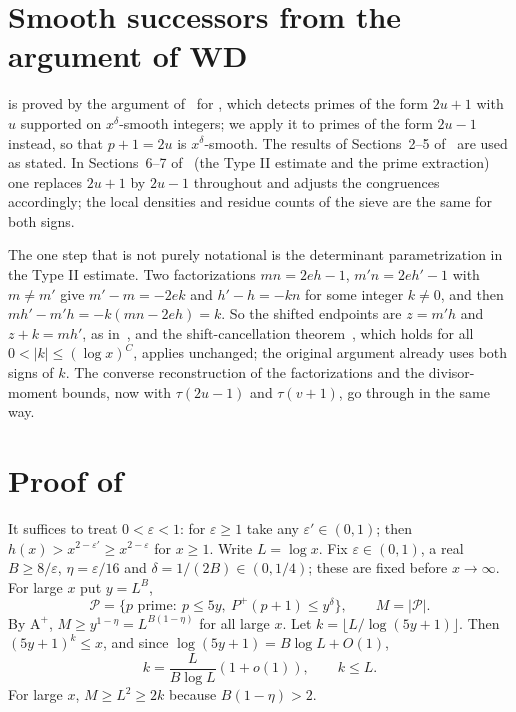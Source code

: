 \documentclass[11pt]{amsart}
\theoremstyle{definition}
\theoremstyle{remark}
\newcommand{\eps}{\varepsilon}
\newcommand{\Pplus}{P^{+}}
\begin{document}
\section{Smooth successors from the argument of WD}\label{sec:sign}

 is proved by the argument of~\cite{WD} for , which detects primes of the form $2u+1$ with $u$ supported on $x^\delta$-smooth integers; we apply it to primes of the form $2u-1$ instead, so that $p+1=2u$ is $x^\delta$-smooth. The results of Sections~2--5 of~\cite{WD} are used as stated. In Sections~6--7 of~\cite{WD} (the Type II estimate and the prime extraction) one replaces $2u+1$ by $2u-1$ throughout and adjusts the congruences accordingly; the local densities and residue counts of the sieve are the same for both signs.

The one step that is not purely notational is the determinant parametrization in the Type II estimate. Two factorizations $mn=2eh-1$, $m'n=2eh'-1$ with $m\ne m'$ give $m'-m=-2ek$ and $h'-h=-kn$ for some integer $k\ne0$, and then $mh'-m'h=-k(mn-2eh)=k$. So the shifted endpoints are $z=m'h$ and $z+k=mh'$, as in~\cite{WD}, and the shift-cancellation theorem~\cite[Theorem~5.1]{WD}, which holds for all $0<|k|\le(\log x)^C$, applies unchanged; the original argument already uses both signs of $k$. The converse reconstruction of the factorizations and the divisor-moment bounds, now with $\tau(2u-1)$ and $\tau(v+1)$, go through in the same way.

\section{Proof of }\label{sec:reduction}

It suffices to treat $0<\eps<1$: for $\eps\ge1$ take any $\eps'\in(0,1)$; then $h(x)>x^{2-\eps'}\ge x^{2-\eps}$ for $x\ge1$. Write $L=\log x$. Fix $\eps\in(0,1)$, a real $B\ge8/\eps$, $\eta=\eps/16$ and $\delta=1/(2B)\in(0,1/4)$; these are fixed before $x\to\infty$. For large $x$ put $y=L^B$,
\[
 \mathcal P=\{p\text{ prime}:\ p\le5y,\ \Pplus(p+1)\le y^\delta\},\qquad M=|\mathcal P|.
\]
By $\mathrm{A}^+$, $M\ge y^{1-\eta}=L^{B(1-\eta)}$ for all large $x$. Let $k=\lfloor L/\log(5y+1)\rfloor$. Then $(5y+1)^k\le x$, and since $\log(5y+1)=B\log L+O(1)$,
\begin{equation}\label{eq:k}
 k=\frac{L}{B\log L}(1+o(1)),\qquad k\le L .
\end{equation}
For large $x$, $M\ge L^2\ge2k$ because $B(1-\eta)>2$.
\end{document}
